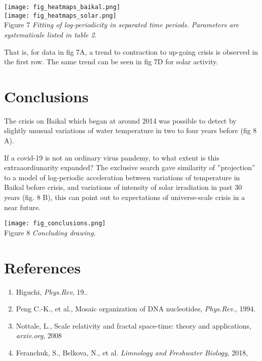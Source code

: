 \documentclass[a4paper]{article}
\begin{document}
\newpage

\texttt{[image: fig\_heatmaps\_baikal.png]}\\

\texttt{[image: fig\_heatmaps\_solar.png]}\\
Figure 7 \textit{Fitting of log-periodicity in separated time periods. Parameters are systematicale listed in table 2.}

That is, for data in fig 7A, a trend to contraction to up-going crisis is observed in the first row. The same trend can be seen in fig 7D for solar activity. 

\newpage

\section*{Conclusions}

The crisis on Baikal which began at around 2014 was possible to detect by slightly unusual variations of water temperature in two to four years before (fig 8 A). 

If a covid-19 is not an ordinary virus pandemy, to what extent is this extraaordiunarity expanded? The exclusive search gave similarity of ''projection'' to a model of log-periodic acceleration between variations of temperature in Baikal before crisis, and variations of intensity of solar irradiation in past 30 years (fig. 8 B), this can point out to expectations of universe-scale crisis in a near future.

\vskip 12pt

\texttt{[image: fig\_conclusions.png]}\\
Figure 8 \textit{Concluding drawing.}

\section*{References}

\begin{enumerate}

\item Higuchi, \textit{Phys.Rev}, 19..

\item Peng C.-K., et al., Mosaic organization of DNA nucleotides, \textit{Phys.Rev.}, 1994.

\item Nottale, L., Scale relativity and fractal space-time: theory and applications, \textit{arxiv.org}, 2008

\item Feranchuk, S., Belkova, N., et al. \textit{Limnology and Freshwater Biology}, 2018,

\end{enumerate}
\end{document}
